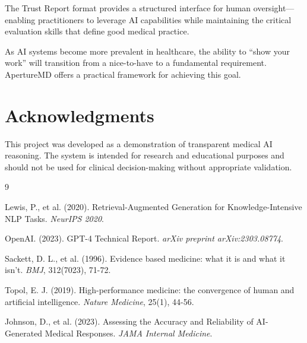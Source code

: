 \documentclass[11pt,a4paper]{article}
\begin{document}
The Trust Report format provides a structured interface for human oversight—enabling practitioners to leverage AI capabilities while maintaining the critical evaluation skills that define good medical practice.

As AI systems become more prevalent in healthcare, the ability to ``show your work'' will transition from a nice-to-have to a fundamental requirement. ApertureMD offers a practical framework for achieving this goal.

\section*{Acknowledgments}

This project was developed as a demonstration of transparent medical AI reasoning. The system is intended for research and educational purposes and should not be used for clinical decision-making without appropriate validation.

\begin{thebibliography}{9}

Lewis, P., et al. (2020). Retrieval-Augmented Generation for Knowledge-Intensive NLP Tasks. \textit{NeurIPS 2020}.

OpenAI. (2023). GPT-4 Technical Report. \textit{arXiv preprint arXiv:2303.08774}.

Sackett, D. L., et al. (1996). Evidence based medicine: what it is and what it isn't. \textit{BMJ}, 312(7023), 71-72.

Topol, E. J. (2019). High-performance medicine: the convergence of human and artificial intelligence. \textit{Nature Medicine}, 25(1), 44-56.

Johnson, D., et al. (2023). Assessing the Accuracy and Reliability of AI-Generated Medical Responses. \textit{JAMA Internal Medicine}.

\end{thebibliography}
\end{document}
